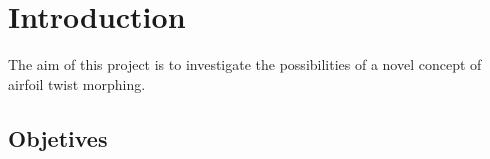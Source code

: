 \chapter{Introduction} \label{chap:introduction}

The aim of this project is to investigate the possibilities of a novel concept of airfoil twist morphing.



\section{Objetives} \label{chap:objetives_introduction}